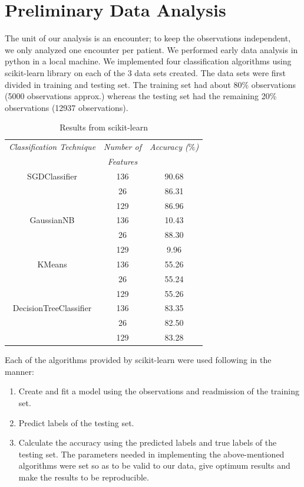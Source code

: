 \documentclass[9pt,twocolumn,twoside]{../../styles/osajnl}
\begin{document}
\section{Preliminary Data Analysis}
The unit of our analysis is an encounter; to keep the observations independent, we only analyzed one encounter per patient.
We performed early data analysis in python in a local machine. We implemented four classification algorithms using scikit-learn library on each of the 3 data sets created. The data sets were first divided in training and testing set. The training set had about 80$\%$ observations (5000 observations approx.) whereas the testing set had the remaining 20$\%$ observations (12937 observations). 
\begin{table}[h!]
\centering
\caption{Results from scikit-learn}
 \begin{tabular}{|c c c|} 
 \hline
 \textit{Classification Technique} & \textit{Number of} & \textit{Accuracy ($\%$)}\\ 
 & \textit{Features} &\\
 \hline
 \hline 
  SGDClassifier\cite{www-sgd} & 136 & 90.68 \\  & 26 & 86.31\\
  & 129 & 86.96\\
 \hline 
  GaussianNB\cite{www-gnb} & 136 & 10.43 \\  & 26 & 88.30\\
  & 129 & 9.96\\ 
 \hline 
   KMeans\cite{www-kmeans} & 136 & 55.26 \\ 
   & 26 & 55.24\\
  & 129 & 55.26\\ 
 \hline 
DecisionTreeClassifier\cite{www-dtc} & 136 & 83.35 \\ & 26 & 82.50\\
  & 129 & 83.28\\
\hline 
\end{tabular}
\label{table:sklearn}
\end{table}


Each of the algorithms provided by scikit-learn were used following in the manner:
\begin{enumerate}
\item Create and fit a model using the observations and readmission of the training set.
\item Predict labels of the testing set.
\item Calculate the accuracy using the predicted labels and true labels of the testing set. The parameters needed in implementing the above-mentioned algorithms were set so as to be valid to our data, give optimum results and make the results to be reproducible.
\end{enumerate}
\end{document}
